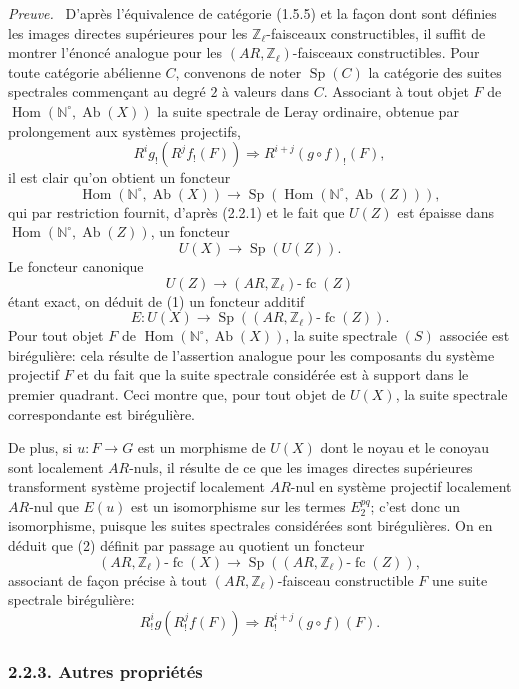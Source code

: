 \documentclass[11pt]{article}
\newenvironment{prooftext}[1][Proof]{\par\noindent\emph{#1.}\ }{\par\medskip}
\DeclareMathOperator{\Hom}{Hom}
\providecommand{\Hom}{\operatorname{Hom}}
\providecommand{\Sp}{\operatorname{Sp}}
\providecommand{\Ab}{\operatorname{Ab}}
\providecommand{\fc}{\operatorname{fc}}
\providecommand{\Ab}{\operatorname{Ab}}
\providecommand{\Hom}{\operatorname{Hom}}
\begin{document}
\begin{prooftext}[Preuve]
D'après l'équivalence de catégorie (1.5.5) et la façon dont sont définies les images directes supérieures pour les \(\mathbb Z_\ell\)-faisceaux constructibles, il suffit de montrer l'énoncé analogue pour les \((AR,\mathbb Z_\ell)\)-faisceaux constructibles. Pour toute catégorie abélienne \(C\), convenons de noter \(\Sp(C)\) la catégorie des suites spectrales commençant au degré \(2\) à valeurs dans \(C\). Associant à tout objet \(F\) de \(\Hom(\mathbb N^\circ,\Ab(X))\) la suite spectrale de Leray ordinaire, obtenue par prolongement aux systèmes projectifs,
\[
R^i g_!(R^j f_!(F))\Longrightarrow R^{i+j}(g\circ f)_!(F),
\tag{S}
\]
il est clair qu'on obtient un foncteur
\[
\Hom(\mathbb N^\circ,\Ab(X))\longrightarrow \Sp(\Hom(\mathbb N^\circ,\Ab(Z))),
\]
qui par restriction fournit, d'après (2.2.1) et le fait que \(U(Z)\) est épaisse dans \(\Hom(\mathbb N^\circ,\Ab(Z))\), un foncteur
\[
U(X)\longrightarrow \Sp(U(Z)).
\tag{1}
\]
Le foncteur canonique
\[
U(Z)\longrightarrow (AR,\mathbb Z_\ell)\text{-}\fc(Z)
\]
étant exact, on déduit de (1) un foncteur additif
\[
E:U(X)\longrightarrow \Sp((AR,\mathbb Z_\ell)\text{-}\fc(Z)).
\tag{2}
\]
Pour tout objet \(F\) de \(\Hom(\mathbb N^\circ,\Ab(X))\), la suite spectrale \((S)\) associée est birégulière: cela résulte de l'assertion analogue pour les composants du système projectif \(F\) et du fait que la suite spectrale considérée est à support dans le premier quadrant. Ceci montre que, pour tout objet de \(U(X)\), la suite spectrale correspondante est birégulière.

De plus, si \(u:F\to G\) est un morphisme de \(U(X)\) dont le noyau et le conoyau sont localement \(AR\)-nuls, il résulte de ce que les images directes supérieures transforment système projectif localement \(AR\)-nul en système projectif localement \(AR\)-nul que \(E(u)\) est un isomorphisme sur les termes \(E_2^{pq}\); c'est donc un isomorphisme, puisque les suites spectrales considérées sont birégulières. On en déduit que (2) définit par passage au quotient un foncteur
\[
(AR,\mathbb Z_\ell)\text{-}\fc(X)
\longrightarrow \Sp((AR,\mathbb Z_\ell)\text{-}\fc(Z)),
\tag{3}
\]
associant de façon précise à tout \((AR,\mathbb Z_\ell)\)-faisceau constructible \(F\) une suite spectrale birégulière:
\[
R^i_!g(R^j_!f(F))\Longrightarrow R^{i+j}_!(g\circ f)(F).
\]
\end{prooftext}

\subsubsection*{2.2.3. Autres propriétés}
\end{document}
